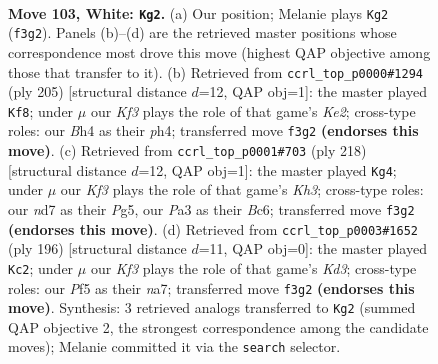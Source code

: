 \documentclass[11pt]{article}
\begin{document}
\clearpage

\begin{figure}[p]\centering
\begin{subfigure}{0.46\textwidth}\centering
\resizebox{\linewidth}{!}{%
\newchessgame
\chessboard[
  setfen={7k/3n4/8/5P2/p6B/P4K1P/8/8 w - - 25 103},
  showmover=false,
  pgfstyle=straightmove, color=movearrow, markmove={f3-g2}
]}
\caption{}
\end{subfigure}\hfill
\begin{subfigure}{0.46\textwidth}\centering
\resizebox{\linewidth}{!}{%
\newchessgame
\chessboard[
  setfen={8/4k1p1/8/4K3/1p5P/8/1P6/8 b - - 2 103},
  showmover=false,
  pgfstyle=straightmove, color=movearrow, markmove={e7-f8}
]}
\caption{}
\end{subfigure}
\\[4pt]
\begin{subfigure}{0.46\textwidth}\centering
\resizebox{\linewidth}{!}{%
\newchessgame
\chessboard[
  setfen={5k2/8/2B5/5PP1/8/7K/8/b7 w - - 69 110},
  showmover=false,
  pgfstyle=straightmove, color=movearrow, markmove={h3-g4}
]}
\caption{}
\end{subfigure}\hfill
\begin{subfigure}{0.46\textwidth}\centering
\resizebox{\linewidth}{!}{%
\newchessgame
\chessboard[
  setfen={8/n7/8/p1k4B/8/2PK4/P7/8 w - - 71 99},
  showmover=false,
  pgfstyle=straightmove, color=movearrow, markmove={d3-c2}
]}
\caption{}
\end{subfigure}
\caption{\textbf{Move 103, White: \texttt{Kg2}.} (a) Our position; Melanie plays \texttt{Kg2} (\texttt{f3g2}). Panels (b)--(d) are the retrieved master positions whose correspondence most drove this move (highest QAP objective among those that transfer to it). (b) Retrieved from \texttt{ccrl\_top\_p0000\#1294} (ply 205) [structural distance $d$=12, QAP obj=1]: the master played \texttt{Kf8}; under $\mu$ our \emph{Kf3} plays the role of that game's \emph{Ke2}; cross-type roles: our \emph{B}h4 as their \emph{p}h4; transferred move \texttt{f3g2} \textbf{(endorses this move)}. (c) Retrieved from \texttt{ccrl\_top\_p0001\#703} (ply 218) [structural distance $d$=12, QAP obj=1]: the master played \texttt{Kg4}; under $\mu$ our \emph{Kf3} plays the role of that game's \emph{Kh3}; cross-type roles: our \emph{n}d7 as their \emph{P}g5, our \emph{P}a3 as their \emph{B}c6; transferred move \texttt{f3g2} \textbf{(endorses this move)}. (d) Retrieved from \texttt{ccrl\_top\_p0003\#1652} (ply 196) [structural distance $d$=11, QAP obj=0]: the master played \texttt{Kc2}; under $\mu$ our \emph{Kf3} plays the role of that game's \emph{Kd3}; cross-type roles: our \emph{P}f5 as their \emph{n}a7; transferred move \texttt{f3g2} \textbf{(endorses this move)}. Synthesis: 3 retrieved analogs transferred to \texttt{Kg2} (summed QAP objective 2, the strongest correspondence among the candidate moves); Melanie committed it via the \texttt{search} selector.}
\label{fig:thought-m204}
\end{figure}
\end{document}
